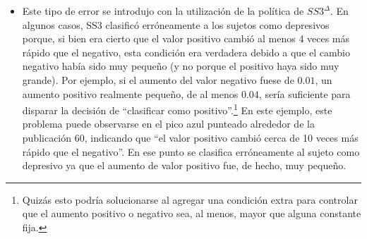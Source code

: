 \begin{itemize}
\item[(d)]
Este tipo de error se introdujo con la utilización de la política de $SS3^\Delta$.
En algunos casos, SS3 clasificó erróneamente a los sujetos como depresivos porque, si bien era cierto que el valor positivo cambió al menos 4 veces más rápido que el negativo, esta condición era verdadera debido a que el cambio negativo había sido muy pequeño (y no porque el positivo haya sido muy grande).
Por ejemplo, si el aumento del valor negativo fuese de $0.01$, un aumento positivo realmente pequeño, de al menos $0.04$, sería suficiente para disparar la decisión de ``clasificar como positivo''.\footnote{Quizás esto podría solucionarse al agregar una condición extra para controlar que el aumento positivo o negativo sea, al menos, mayor que alguna constante fija.}
En este ejemplo, este problema puede observarse en el pico azul punteado alrededor de la publicación 60, indicando que ``el valor positivo cambió cerca de 10 veces más rápido que el negativo''. En ese punto se clasifica erróneamente al sujeto como depresivo ya que el aumento de valor positivo fue, de hecho, muy pequeño.
\end{itemize}


